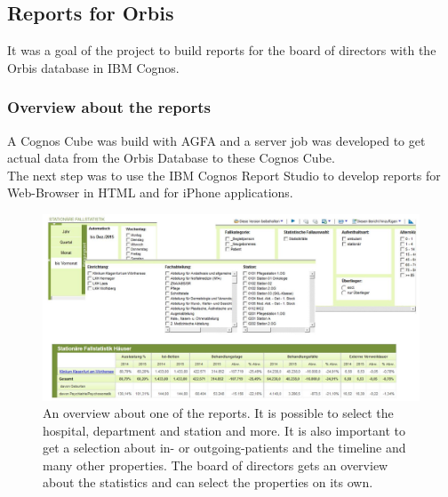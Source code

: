 \documentclass[a4paper]{article}
\begin{document}
	\subsection{Reports for Orbis}
	It was a goal of the project to build reports for the board of directors with
	the Orbis database in IBM Cognos. 
	\subsubsection{Overview about the reports}
	A Cognos Cube was build with AGFA and a server job was developed
	to get actual data from the Orbis Database to these Cognos Cube.\\
	The next step was to use the IBM Cognos Report Studio to develop reports for
	Web-Browser in HTML and for iPhone applications.
	\begin{figure}[!ht]
		  \centering
		      \includegraphics[width=1.0\textwidth]{reports_overview}
		  \caption{An overview about one of the reports. It is
		  possible to select the hospital, department and station and more. It is
		  also important to get a selection about in- or outgoing-patients and the
		  timeline and many other properties. The board of directors gets an
		  overview about the statistics and can select the properties on
		  its own.}
	\end{figure}
\end{document}
